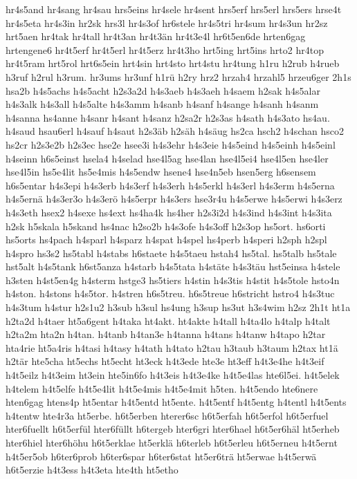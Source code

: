 {hr4s5and
hr4sang
hr4sau
hrs5eins
hr4sele
hr4sent
hrs5erf
hrs5erl
hrs5ers
hrse4t
hr4s5eta
hr4s3in
hr2sk
hrs3l
hr4s3of
hr6stele
hr4s5tri
hr4sum
hr4s3un
hr2sz
hrt5aen
hr4tak
hr4tall
hr4t3an
hr4t3än
hr4t3e4l
hr6t5en6de
hrten6gag
hrtengene6
hr4t5erf
hr4t5erl
hr4t5erz
hr4t3ho
hrt5ing
hrt5ins
hrto2
hr4top
hr4t5ram
hrt5rol
hrt6s5ein
hrt4sin
hrt4sto
hrt4stu
hr4tung
h1ru
h2rub
h4rueb
h3ruf
h2rul
h3rum.
hr3ums
hr3unf
h1rü
h2ry
hrz2
hrzah4
hrzahl5
hrzeu6ger
2h1s
hsa2b
h4s5achs
h4s5acht
h2s3a2d
h4s3aeb
h4s3aeh
h4saem
h2sak
h4s5alar
h4s3alk
h4s3all
h4s5alte
h4s3amm
h4sanb
h4sanf
h4sange
h4sanh
h4sanm
h4sanna
hs4anne
h4sanr
h4sant
h4sanz
h2sa2r
h2s3as
h4sath
h4s3ato
hs4au.
h4saud
hsau6erl
h4sauf
h4saut
h2s3äb
h2säh
h4säug
hs2ca
hsch2
h4schan
hsco2
hs2cr
h2s3e2b
h2s3ec
hse2e
hsee3i
h4s3ehr
h4s3eie
h4s5eind
h4s5einh
h4s5einl
h4seinn
h6s5einst
hsela4
h4selad
hse4l5ag
hse4lan
hse4l5ei4
hse4l5en
hse4ler
hse4l5in
hs5e4lit
hs5e4mis
h4s5endw
hsene4
hse4n5eb
hsen5erg
h6sensem
h6s5entar
h4s3epi
h4s3erb
h4s3erf
h4s3erh
h4s5erkl
h4s3erl
h4s3erm
h4s5erna
h4s5ernä
h4s3er3o
h4s3erö
h4s5erpr
h4s3ers
hse3r4u
h4s5erwe
h4s5erwi
h4s3erz
h4s3eth
hsex2
h4sexe
hs4ext
hs4ha4k
hs4her
h2s3i2d
h4s3ind
h4s3int
h4s3ita
h2sk
h5skala
h5skand
hs4nac
h2so2b
h4s3ofe
h4s3off
h2s3op
hs5ort.
hs6orti
hs5orts
hs4pach
h4sparl
h4sparz
h4spat
h4spel
hs4perb
h4speri
h2sph
h2spl
h4spro
hs3s2
hs5tabl
h4stabs
h6staete
h4s5taeu
hstah4
hs5tal.
hs5talb
hs5tale
hst5alt
h4s5tank
h6st5anza
h4starb
h4s5tata
h4stäte
h4s3täu
hst5einsa
h4stele
h3sten
h4st5en4g
h4sterm
hstge3
hs5tiers
h4stin
h4s3tis
h4stit
h4s5tole
hsto4n
h4ston.
h4stons
h4s5tor.
h4stren
h6s5treu.
h6s5treue
h6stricht
hstro4
h4s3tuc
h4s3tum
h4stur
h2s1u2
h3sub
h3sul
hs4ung
h3sup
hs3ut
h3s4wim
h2sz
2h1t
ht1a
h2ta2d
h4taer
ht5a6gent
h4taka
ht4akt.
ht4akte
h4tall
h4ta4lo
h4talp
h4talt
h2ta2m
hta2n
h4tan.
h4tanb
h4tan3e
h4tanna
h4tans
h4tanw
h4tapo
h2tar
hta4rie
ht5a4ris
h4tasi
h4tasy
h4tath
h4tato
h2tau
h3taub
h3taum
h2tax
ht1ä
h2tär
hte5cha
ht5echs
ht5echt
ht3eck
h4t3ede
hte3e
ht3eff
h4t3e4he
h4t3eif
h4t5eilz
h4t3eim
ht3ein
hte5in6fo
h4t3eis
h4t3e4ke
h4t5e4las
hte6l5ei.
h4t5elek
h4telem
h4t5elfe
h4t5e4lit
h4t5e4mis
h4t5e4mit
h5ten.
h4t5endo
hte6nere
hten6gag
htens4p
ht5entar
h4t5entd
ht5ente.
h4t5entf
h4t5entg
h4tentl
h4t5ents
h4tentw
hte4r3a
ht5erbe.
h6t5erben
hterer6sc
h6t5erfah
h6t5erfol
h6t5erfuel
hter6fuellt
h6t5erfül
hter6füllt
h6tergeb
hter6gri
hter6hael
h6t5er6häl
ht5erheb
hter6hiel
hter6höhu
h6t5erklae
ht5erklä
h6terleb
h6t5erleu
h6t5erneu
h4t5ernt
h4t5er5ob
h6ter6prob
h6ter6spar
h6ter6stat
ht5er6trä
ht5erwae
h4t5erwä
h6t5erzie
h4t3ess
h4t3eta
hte4th
ht5etho
}
